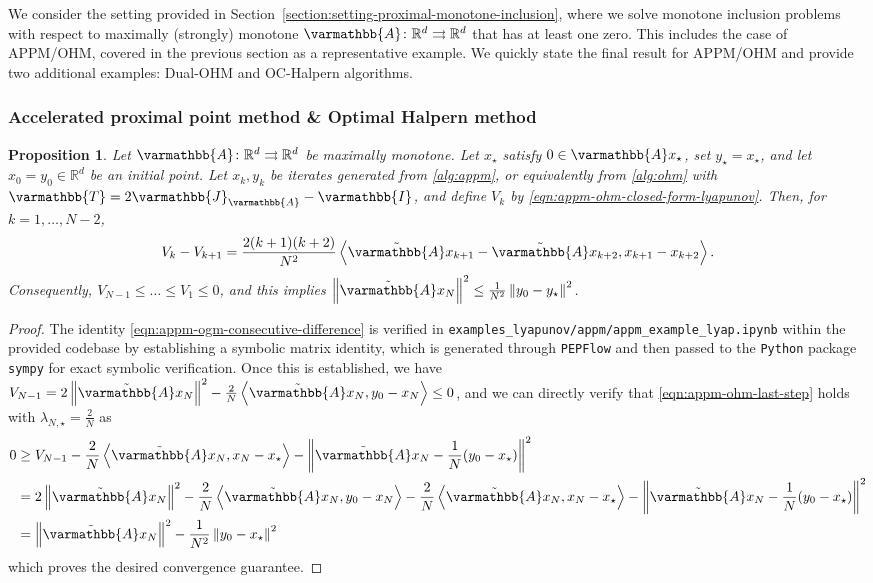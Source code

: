 \documentclass{article}
\theoremstyle{definition}
\theoremstyle{plain}
\newtheorem{proposition}{Proposition}
\newcommand{\reals}{\mathbb{R}}
\newcommand{\opA}{{\varmathbb{A}}}
\newcommand{\opI}{{\varmathbb{I}}}
\newcommand{\opJ}{{\varmathbb{J}}}
\newcommand{\opT}{{\varmathbb{T}}}
\newcommand{\inprod}[2]{\left\langle #1,#2 \right\rangle}
\newcommand{\sqnorm}[1]{\left\| #1 \right\|^2}
\newcommand{\topa}{\tilde{\opA}}
\begin{document}
We consider the setting provided in Section~\ref{section:setting-proximal-monotone-inclusion}, where we solve monotone inclusion problems 
with respect to maximally (strongly) monotone $\opA\colon \reals^d \rightrightarrows \reals^d$ that has at least one zero.
This includes the case of APPM/OHM, covered in the previous section as a representative example.
We quickly state the final result for APPM/OHM and provide two additional examples: Dual-OHM \citep{YoonKimSuhRyu2024_optimal} and OC-Halpern \citep{ParkRyu2022_exact} algorithms.

\subsubsection{Accelerated proximal point method \& Optimal Halpern method}
\label{section:appm-ohm}

\begin{proposition}
Let $\opA\colon\reals^d\rightrightarrows\reals^d$ be maximally monotone.
Let $x_\star$ satisfy $0\in\opA x_\star$, set $y_\star=x_\star$, and let $x_0 = y_0 \in \reals^d$ be an initial point.
Let $x_k, y_k$ be iterates generated from \eqref{alg:appm}, or equivalently from \eqref{alg:ohm} with $\opT = 2\opJ_\opA - \opI$, and define $V_k$ by \eqref{eqn:appm-ohm-closed-form-lyapunov}.
Then, for $k=1,\dots,N-2$,
\begin{align}
\label{eqn:appm-ogm-consecutive-difference}
    V_k-V_{k+1} = \frac{2(k+1)(k+2)}{N^2} \inprod{\topa x_{k+1}-\topa x_{k+2}}{x_{k+1}-x_{k+2}} .
\end{align}
Consequently, $V_{N-1}\le\dots\le V_1\le 0$, and this implies $\sqnorm{\topa x_N}\le \frac{1}{N^2}\sqnorm{y_0-y_\star}$.
\end{proposition}

\begin{proof}
The identity \eqref{eqn:appm-ogm-consecutive-difference} is verified in \texttt{examples\_lyapunov/appm/appm\_example\_lyap.ipynb} within the provided codebase 
by establishing a symbolic matrix identity, which is 
generated through \texttt{PEPFlow} and then passed to the \texttt{Python} package \texttt{sympy} for exact symbolic verification. 
Once this is established, we have $V_{N-1} = 2\sqnorm{\topa x_N} - \frac{2}{N}\inprod{\topa x_N}{y_0 - x_N} \le 0$, and we can directly verify that \eqref{eqn:appm-ohm-last-step} holds with $\lambda_{N,\star} = \frac{2}{N}$ as
\begin{align*}
    0 & \ge V_{N-1} - \frac{2}{N}\inprod{\topa x_N}{x_N-x_\star} - \sqnorm{\topa x_N-\frac{1}{N}(y_0-x_\star)} \\
    & = 2\sqnorm{\topa x_N} - \frac{2}{N} \inprod{\topa x_N}{y_0 - x_N} - \frac{2}{N}\inprod{\topa x_N}{x_N-x_\star} - \sqnorm{\topa x_N-\frac{1}{N}(y_0-x_\star)} \\
    & = \sqnorm{\topa x_N} - \frac{1}{N^2} \sqnorm{y_0 - x_\star}
\end{align*}
which proves the desired convergence guarantee.
\end{proof}
\end{document}
